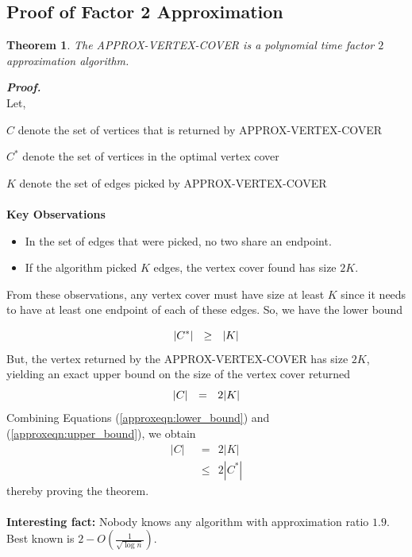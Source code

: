 \documentclass[12pt, a4paper]{article}
\begin{document}
	\pagebreak
	
	
	\pagebreak
	\subsection{Proof of Factor 2 Approximation}
	\newtheorem{theorem}{Theorem}
	\begin{theorem}
		The APPROX-VERTEX-COVER is a polynomial time factor $2$ approximation algorithm.
	\end{theorem}
	\textbf{\textit{Proof.\\}}
	Let, \\\par${C}$ denote the set of vertices that is returned by APPROX-VERTEX-COVER\\
	\par${C^*}$ denote the set of vertices in the optimal vertex cover\\
	\par${K}$ denote the set of edges picked by APPROX-VERTEX-COVER\\\\
	\textbf{Key Observations}
	\begin{itemize}
		\item In the set of edges that were picked, no two share an endpoint.
		\item If the algorithm picked ${K}$ edges, the vertex cover found has size ${2K}$.
		
	\end{itemize}
	From these observations, any vertex cover must have size at least ${K}$ since
	it needs to have at least one endpoint of each of these edges. So, we have the lower
	bound
	
	\begin{equation}
		|{C^*}| ~~\geq~~ |{K}| \\
		\label{approxeqn:lower_bound}
	\end{equation}
	But, the vertex returned by the APPROX-VERTEX-COVER has size ${2K}$, yielding an exact upper bound on the size of the vertex cover returned
	\begin{equation}
		|{C}| ~~=~~ 2|{K}|\\
		\label{approxeqn:upper_bound}
	\end{equation}
	Combining Equations (\ref{approxeqn:lower_bound}) and (\ref{approxeqn:upper_bound}), we obtain
	\begin{equation}
		\begin{split}
			|{C}| ~~&=~~ 2|{K}|\\
			&\leq ~~2|{C^*}|
		\end{split}
	\end{equation}
	thereby proving the theorem.\\\\
	\textbf{Interesting fact:} Nobody knows any algorithm with approximation ratio $1.9$. 
	Best known is $2 - O\left(\frac{1}{\sqrt{\log n}}\right)$.
	\pagebreak
\end{document}
